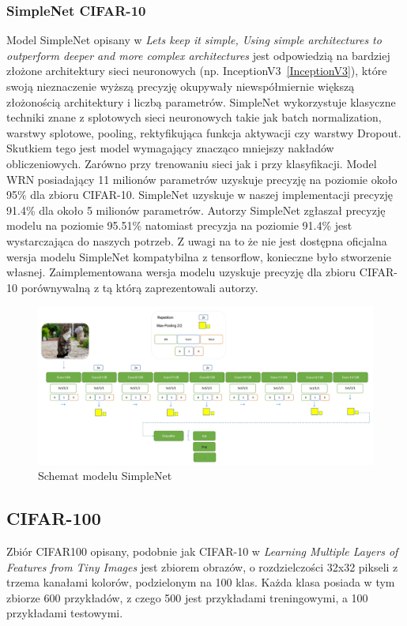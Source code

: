 \documentclass[
    left=2.5cm,         %
    right=2.5cm,        %
    top=2.5cm,          %
    bottom=3cm,         %
    bindingoffset=6mm,  %
    nohyphenation=false %
]{eiti/eiti-thesis}
\begin{document}
        \subsubsection{SimpleNet CIFAR-10}
        Model SimpleNet opisany w
        \textit{Lets keep it simple, Using simple architectures to outperform deeper and more complex architectures}\cite{DBLP:journals/corr/HasanPourRVS16}
        jest odpowiedzią na bardziej złożone
        architektury sieci neuronowych (np. InceptionV3~\ref{InceptionV3}), które swoją nieznaczenie wyższą precyzję
        okupywały niewspółmiernie większą złożonością architektury i liczbą parametrów. SimpleNet wykorzystuje klasyczne
        techniki znane z splotowych sieci neuronowych takie jak batch normalization, warstwy splotowe, pooling,
        rektyfikująca funkcja aktywacji czy warstwy Dropout. Skutkiem tego jest model wymagający znacząco mniejszy nakładów
        obliczeniowych. Zarówno przy trenowaniu sieci jak i przy klasyfikacji. Model WRN\cite{DBLP:journals/corr/ZagoruykoK16}
        posiadający 11 milionów parametrów uzyskuje precyzję na poziomie około 95\% dla zbioru CIFAR-10.
        SimpleNet uzyskuje w naszej implementacji precyzję 91.4\% dla około 5 milionów parametrów.
        Autorzy SimpleNet zgłaszał precyzję modelu na poziomie 95.51\% natomiast precyzja na poziomie 91.4\% jest wystarczająca do naszych potrzeb.
        Z uwagi na to że nie jest dostępna oficjalna wersja modelu SimpleNet kompatybilna z tensorflow, konieczne było stworzenie własnej.
        Zaimplementowana wersja modelu uzyskuje precyzję dla zbioru CIFAR-10 porównywalną z tą którą zaprezentowali autorzy.
        \begin{figure}[H]
            \centring
            \includegraphics[width=\textwidth]{eiti/simplenet_overview.jpg}
            \caption{Schemat modelu SimpleNet}
        \end{figure}

    \subsection{CIFAR-100}
    Zbiór CIFAR100 opisany, podobnie jak CIFAR-10 w  \textit{Learning Multiple Layers of Features from Tiny Images} \cite{Krizhevsky2009LearningML}
    jest zbiorem obrazów, o rozdzielczości 32x32 pikseli z trzema kanałami kolorów, podzielonym na 100 klas.
    Każda klasa posiada w tym zbiorze 600 przykładów, z czego 500 jest przykładami treningowymi, a 100 przykładami testowymi.
\end{document}
